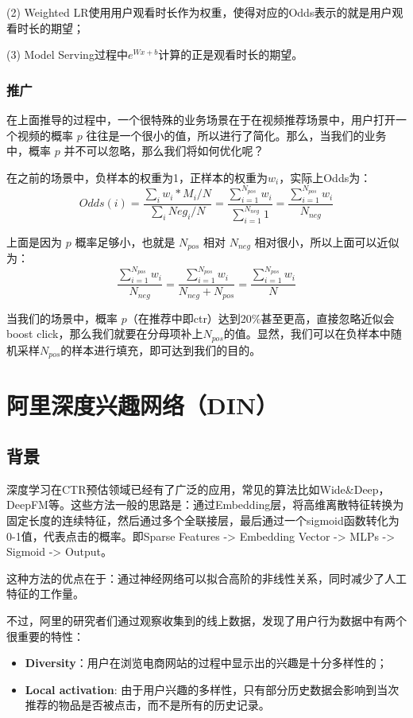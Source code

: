 \documentclass[12pt]{article}
\begin{document}
(2) Weighted LR使用用户观看时长作为权重，使得对应的Odds表示的就是用户观看时长的期望；

(3) Model Serving过程中$e^{Wx+b}$计算的正是观看时长的期望。

\subsubsection{推广}
在上面推导的过程中，一个很特殊的业务场景在于在视频推荐场景中，用户打开一个视频的概率 $p$ 往往是一个很小的值，所以进行了简化。那么，当我们的业务中，概率 $p$ 并不可以忽略，那么我们将如何优化呢？

在之前的场景中，负样本的权重为1，正样本的权重为$w_i$，实际上Odds为：
$$
Odds(i) = \frac{\sum_iw_i * M_i/N}{\sum_i Neg_i/N} = \frac{\sum_{i=1}^{N_{pos}}w_i}{\sum_{i=1}^{N_{neg}}1} = \frac{\sum_{i=1}^{N_{pos}}w_i}{N_{neg}}
$$

上面是因为 $p$ 概率足够小，也就是 $N_{pos}$ 相对 $N_{neg}$ 相对很小，所以上面可以近似为：
$$
\frac{\sum_{i=1}^{N_{pos}}w_i}{N_{neg}} = \frac{\sum_{i=1}^{N_{pos}}w_i}{N_{neg} + N_{pos}} = \frac{\sum_{i=1}^{N_{pos}}w_i}{N}
$$

当我们的场景中，概率 $p$（在推荐中即ctr）达到20\%甚至更高，直接忽略近似会boost click，那么我们就要在分母项补上$N_{pos}$的值。显然，我们可以在负样本中随机采样$N_{pos}$的样本进行填充，即可达到我们的目的。

\section{阿里深度兴趣网络（DIN）}
\subsection{背景\cite{Recommender_System_With_Deep_Learning_DIN}}
深度学习在CTR预估领域已经有了广泛的应用，常见的算法比如Wide\&Deep，DeepFM等。这些方法一般的思路是：通过Embedding层，将高维离散特征转换为固定长度的连续特征，然后通过多个全联接层，最后通过一个sigmoid函数转化为0-1值，代表点击的概率。即Sparse Features -> Embedding Vector -> MLPs -> Sigmoid -> Output。

这种方法的优点在于：通过神经网络可以拟合高阶的非线性关系，同时减少了人工特征的工作量。

不过，阿里的研究者们通过观察收集到的线上数据，发现了用户行为数据中有两个很重要的特性：
\begin{itemize}
\setlength{\itemsep}{0pt}
\setlength{\parsep}{0pt}
\setlength{\parskip}{0pt}
    \item \textbf{Diversity}：用户在浏览电商网站的过程中显示出的兴趣是十分多样性的；
    \item \textbf{Local activation}: 由于用户兴趣的多样性，只有部分历史数据会影响到当次推荐的物品是否被点击，而不是所有的历史记录。
\end{itemize}
\end{document}
